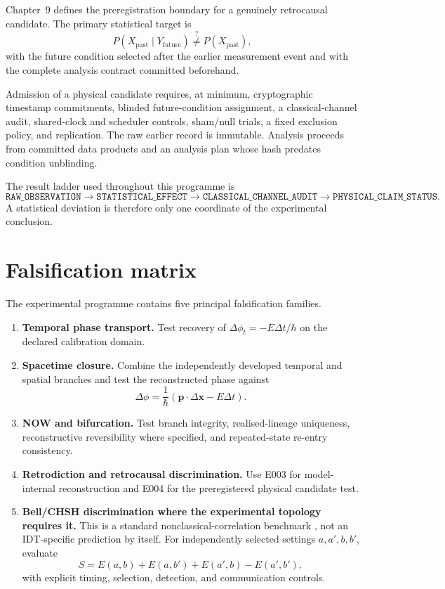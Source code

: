 \documentclass[11pt]{book}
\begin{document}
Chapter~9 defines the preregistration boundary for a genuinely retrocausal candidate. The primary statistical target is
\[
P(X_{\mathrm{past}}\mid Y_{\mathrm{future}})
\stackrel{?}{\neq}
P(X_{\mathrm{past}}),
\]
with the future condition selected after the earlier measurement event and with the complete analysis contract committed beforehand.

Admission of a physical candidate requires, at minimum, cryptographic timestamp commitments, blinded future-condition assignment, a classical-channel audit, shared-clock and scheduler controls, sham/null trials, a fixed exclusion policy, and replication. The raw earlier record is immutable. Analysis proceeds from committed data products and an analysis plan whose hash predates condition unblinding.

The result ladder used throughout this programme is
\[
\texttt{RAW\_OBSERVATION}
\rightarrow
\texttt{STATISTICAL\_EFFECT}
\rightarrow
\texttt{CLASSICAL\_CHANNEL\_AUDIT}
\rightarrow
\texttt{PHYSICAL\_CLAIM\_STATUS}.
\]
A statistical deviation is therefore only one coordinate of the experimental conclusion.

\section{Falsification matrix}

The experimental programme contains five principal falsification families.

\begin{enumerate}
\item \textbf{Temporal phase transport.} Test recovery of \(\Delta\phi_t=-E\Delta t/\hbar\) on the declared calibration domain.
\item \textbf{Spacetime closure.} Combine the independently developed temporal and spatial branches and test the reconstructed phase against
\[
\Delta\phi=\frac{1}{\hbar}
\left(\mathbf p\cdot\Delta\mathbf x-E\Delta t\right).
\]
\item \textbf{NOW and bifurcation.} Test branch integrity, realised-lineage uniqueness, reconstructive reversibility where specified, and repeated-state re-entry consistency.
\item \textbf{Retrodiction and retrocausal discrimination.} Use E003 for model-internal reconstruction and E004 for the preregistered physical candidate test.
\item \textbf{Bell/CHSH discrimination where the experimental topology requires it.} This is a standard nonclassical-correlation benchmark \cite{Bell1964,CHSH1969}, not an IDT-specific prediction by itself. For independently selected settings \(a,a',b,b'\), evaluate
\[
S=E(a,b)+E(a,b')+E(a',b)-E(a',b'),
\]
with explicit timing, selection, detection, and communication controls.
\end{enumerate}
\end{document}
